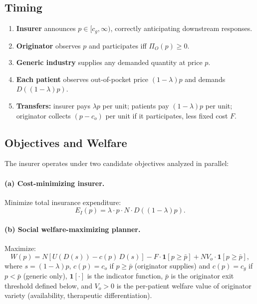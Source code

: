 \documentclass[12pt]{article}
\theoremstyle{plain}
\theoremstyle{definition}
\theoremstyle{remark}
\newcommand{\pbar}{\bar{p}}
\newcommand{\EI}{E_{I}}
\newcommand{\1}{\mathbf{1}}
\begin{document}
\subsection{Timing}

\begin{enumerate}
\item \textbf{Insurer} announces $p \in [c_g, \infty)$, correctly anticipating downstream responses.
\item \textbf{Originator} observes $p$ and participates iff $\Pi_O(p) \geq 0$.
\item \textbf{Generic industry} supplies any demanded quantity at price $p$.
\item \textbf{Each patient} observes out-of-pocket price $(1-\lambda)p$ and demands $D((1-\lambda)p)$.
\item \textbf{Transfers:} insurer pays $\lambda p$ per unit; patients pay $(1-\lambda)p$ per unit; originator collects $(p - c_o)$ per unit if it participates, less fixed cost $F$.
\end{enumerate}

\subsection{Objectives and Welfare}

The insurer operates under two candidate objectives analyzed in parallel:

\paragraph{(a) Cost-minimizing insurer.} Minimize total insurance expenditure:
\begin{equation}
\EI(p) = \lambda \cdot p \cdot N \cdot D\!\left((1-\lambda)p\right).
\label{eq:expend}
\end{equation}

\paragraph{(b) Social welfare-maximizing planner.} Maximize:
\begin{equation}
W(p) = N\!\left[U\!\left(D(s)\right) - c(p)\,D(s)\right] - F\cdot\1\!\left[p \geq \pbar\right] + N V_o \cdot \1\!\left[p \geq \pbar\right],
\label{eq:welfare}
\end{equation}
where $s = (1-\lambda)p$, $c(p) = c_o$ if $p \geq \pbar$ (originator supplies) and $c(p) = c_g$ if $p < \pbar$ (generic only), $\1[\cdot]$ is the indicator function, $\pbar$ is the originator exit threshold defined below, and $V_o > 0$ is the per-patient welfare value of originator variety (availability, therapeutic differentiation).
\end{document}

